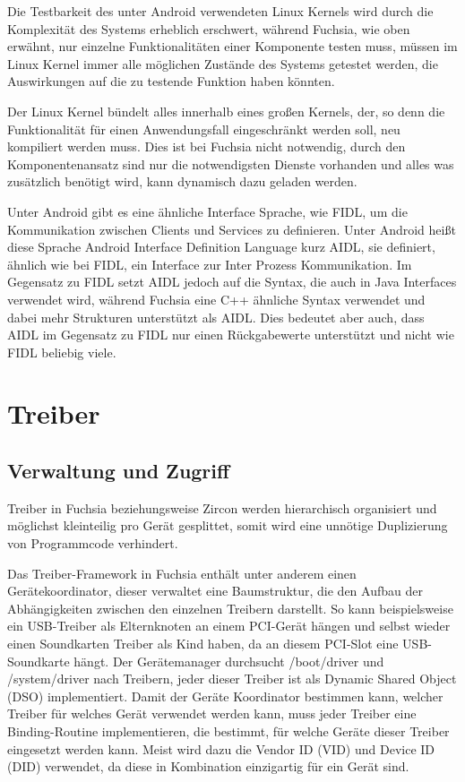 \documentclass[a4paper]{scrartcl}
\begin{document}
Die Testbarkeit des unter Android verwendeten Linux Kernels wird durch die Komplexität des Systems erheblich erschwert, während Fuchsia, wie oben erwähnt, nur einzelne Funktionalitäten einer Komponente testen muss, müssen im Linux Kernel immer alle möglichen Zustände des Systems getestet werden, die Auswirkungen auf die zu testende Funktion haben könnten.

Der Linux Kernel bündelt alles innerhalb eines großen Kernels, der, so denn die Funktionalität für einen Anwendungsfall eingeschränkt werden soll, neu kompiliert werden muss. Dies ist bei Fuchsia nicht notwendig, durch den Komponentenansatz sind nur die notwendigsten Dienste vorhanden und alles was zusätzlich benötigt wird, kann dynamisch dazu geladen werden.

Unter Android gibt es eine ähnliche Interface Sprache, wie FIDL, um die Kommunikation zwischen Clients und Services zu definieren. Unter Android heißt diese Sprache Android Interface Definition Language kurz AIDL, sie definiert, ähnlich wie bei FIDL, ein Interface zur Inter Prozess Kommunikation. Im Gegensatz zu FIDL setzt AIDL jedoch auf die Syntax, die auch in Java Interfaces verwendet wird, während Fuchsia eine C++ ähnliche Syntax verwendet und dabei mehr Strukturen unterstützt als AIDL. Dies bedeutet aber auch, dass AIDL im Gegensatz zu FIDL nur einen Rückgabewerte unterstützt und nicht wie FIDL beliebig viele.
\section{Treiber}
\subsection{Verwaltung und Zugriff}
Treiber in Fuchsia beziehungsweise Zircon werden hierarchisch organisiert und möglichst kleinteilig pro Gerät gesplittet, somit wird eine unnötige Duplizierung von Programmcode verhindert.

Das Treiber-Framework in Fuchsia enthält unter anderem einen Gerätekoordinator, dieser verwaltet eine Baumstruktur, die den Aufbau der Abhängigkeiten zwischen den einzelnen Treibern darstellt. So kann beispielsweise ein USB-Treiber als Elternknoten an einem PCI-Gerät hängen und selbst wieder einen Soundkarten Treiber als Kind haben, da an diesem PCI-Slot eine USB-Soundkarte hängt. Der Gerätemanager durchsucht /boot/driver und /system/driver nach Treibern, jeder dieser Treiber ist als Dynamic Shared Object (DSO) implementiert. Damit der Geräte Koordinator bestimmen kann, welcher Treiber für welches Gerät verwendet werden kann, muss jeder Treiber eine Binding-Routine implementieren, die bestimmt, für welche Geräte dieser Treiber eingesetzt werden kann. Meist wird dazu die Vendor ID (VID) und Device ID (DID) verwendet, da diese in Kombination einzigartig für ein Gerät sind. 
\end{document}
